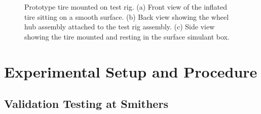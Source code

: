 \documentclass{article}
\begin{document}
\begin{figure}[hbt!]
\begin{minipage}{0.32\textwidth}
    \end{minipage}
        \begin{minipage}{0.32\textwidth}
        \centering
    \end{minipage}
    \caption{Prototype tire mounted on test rig. (a) Front view of the inflated tire sitting on a smooth surface. (b) Back view showing the wheel hub assembly attached to the test rig assembly. (c) Side view showing the tire mounted and resting in the surface simulant box.}
    \label{tire_on_rig}
\end{figure}

\section{Experimental Setup and Procedure}



\subsection{Validation Testing at Smithers}
\end{document}
